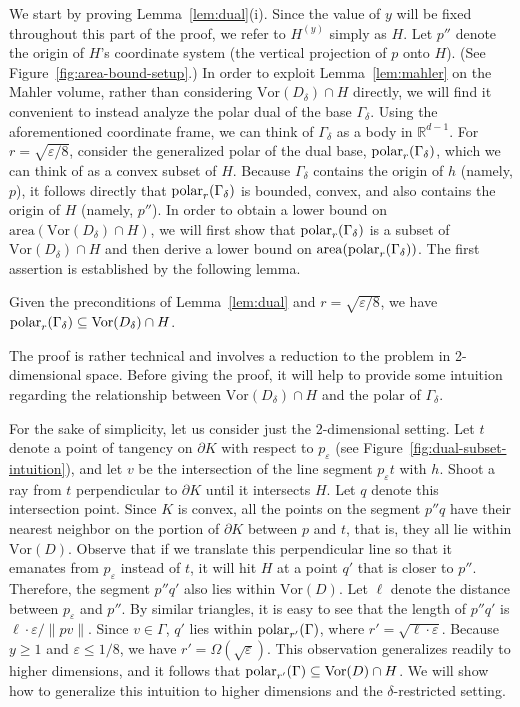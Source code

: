 \documentclass[11pt]{article}   \usepackage[letterpaper,hmargin=2.1cm,vmargin=3cm]{geometry}
\newcommand{\RE}{\mathbb{R}}    \newcommand{\ZZ}{\mathbb{Z}}    \newcommand{\eps}{\varepsilon}  \newcommand{\ST}{\,:\,}         \newcommand{\sq}{\square}
\newcommand{\area}{\mathrm{area}}
\newcommand{\Vor}{\mathrm{Vor}}
\begin{document}
We start by proving Lemma~\ref{lem:dual}(i). Since the value of $y$ will be fixed throughout this part of the proof, we refer to $H^{(y)}$ simply as $H$. Let $p''$ denote the origin of $H$'s coordinate system (the vertical projection of $p$ onto $H$). (See Figure~\ref{fig:area-bound-setup}.) In order to exploit Lemma~\ref{lem:mahler} on the Mahler volume, rather than considering $\Vor(D_{\delta}) \cap H$ directly, we will find it convenient to instead analyze the polar dual of the base $\Gamma_{\delta}$. Using the aforementioned coordinate frame, we can think of $\Gamma_{\delta}$ as a body in $\RE^{d-1}$. For $r = \sqrt{\eps/8}$, consider the generalized polar of the dual base, $\mathrm{polar}_{r}(\Gamma_{\delta})$, which we can think of as a convex subset of $H$. Because $\Gamma_{\delta}$ contains the origin of $h$ (namely, $p$), it follows directly that $\mathrm{polar}_{r}(\Gamma_{\delta})$ is bounded, convex, and also contains the origin of $H$ (namely, $p''$). In order to obtain a lower bound on $\area(\Vor(D_{\delta}) \cap H)$, we will first show that $\mathrm{polar}_{r}(\Gamma_{\delta})$ is a subset of $\Vor(D_{\delta}) \cap H$ and then derive a lower bound on $\area(\polarX{r}{\Gamma_{\delta}})$. The first assertion is established by the following lemma.

\begin{lemma} \label{lem:dual-subset}
Given the preconditions of Lemma~\ref{lem:dual} and $r = \sqrt{\eps/8}$, we have $\polarX{r}{\Gamma_{\delta}} \subseteq \Vor(D_{\delta}) \cap H$.
\end{lemma}


The proof is rather technical and involves a reduction to the problem in 2-dimensional space. Before giving the proof, it will help to provide some intuition regarding the relationship between $\Vor(D_{\delta}) \cap H$ and the polar of $\Gamma_{\delta}$. 

For the sake of simplicity, let us consider just the 2-dimensional setting. Let $t$ denote a point of tangency on $\partial K$ with respect to $p_{\eps}$ (see Figure~\ref{fig:dual-subset-intuition}), and let $v$ be the intersection of the line segment $p_{\eps} t$ with $h$. Shoot a ray from $t$ perpendicular to $\partial K$ until it intersects $H$. Let $q$ denote this intersection point. Since $K$ is convex, all the points on the segment $p'' q$ have their nearest neighbor on the portion of $\partial K$ between $p$ and $t$, that is, they all lie within $\Vor(D)$. Observe that if we translate this perpendicular line so that it emanates from $p_{\eps}$ instead of $t$, it will hit $H$ at a point $q'$ that is closer to $p''$. Therefore, the segment $p'' q'$ also lies within $\Vor(D)$. Let $\ell$ denote the distance between $p_{\eps}$ and $p''$. By similar triangles, it is easy to see that the length of $p'' q'$ is $\ell \cdot \eps/\|p v\|$. Since $v \in \Gamma$, $q'$ lies within $\mathrm{polar}_{r'}(\Gamma)$, where $r' = \sqrt{\ell \cdot \eps}$. Because $y \ge 1$ and $\eps \le 1/8$, we have $r' = \Omega(\sqrt{\eps})$. This observation generalizes readily to higher dimensions, and it follows that $\polarX{r'}{\Gamma} \subseteq \Vor(D) \cap H$. We will show how to generalize this intuition to higher dimensions and the $\delta$-restricted setting.
\end{document}
